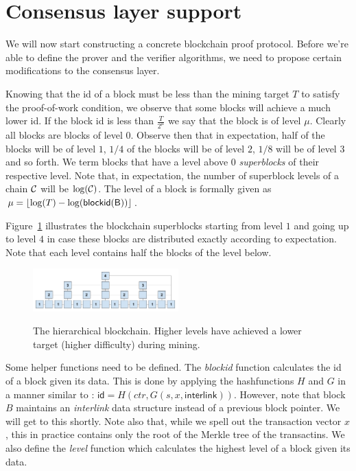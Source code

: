 \section{Consensus layer support}

We will now start constructing a concrete blockchain proof protocol. Before
we're able to define the prover and the verifier algorithms, we need to propose
certain modifications to the consensus layer.

Knowing that the id of a block must be less than the mining target $T$ to
satisfy the proof-of-work condition, we observe that some blocks will achieve a
much lower id. If the block id is less than $\frac{T}{2^\mu}$ we say that the
block is of level $\mu$. Clearly all blocks are blocks of level $0$. Observe
then that in expectation, half of the blocks will be of level $1$, $1/4$ of the
blocks will be of level $2$, $1/8$ will be of level $3$ and so forth. We term
blocks that have a level above 0 \textit{superblocks} of their respective
level. Note that, in expectation, the number of superblock levels of a chain
$\mathcal{C}$ will be $\log(\mathcal{C})$. The level of a block is formally given as $\mu
= \left \lfloor \log(T) - \log(\sf{blockid}(B)) \right \rfloor$.

Figure~\ref{fig.hierarchy} illustrates the blockchain superblocks starting from
level $1$ and going up to level $4$ in case these blocks are distributed
exactly according to expectation. Note that each level contains half the blocks
of the level below.

\begin{figure}
    \caption{The hierarchical blockchain.
    Higher levels have achieved a lower target (higher difficulty) during mining.}
    \centering
    \includegraphics[width=0.5\textwidth,keepaspectratio]{figures/hierarchical-ledger.png}
    \label{fig.hierarchy}
\end{figure}

Some helper functions need to be defined. The \textit{blockid} function
calculates the id of a block given its data. This is done by applying the
hashfunctions $H$ and $G$ in a manner similar to \cite{backbone}:
$\textsf{id} = H(ctr, G(s, x, \textsf{interlink}))$. However, note that block
$B$ maintains an \textit{interlink} data structure instead of a previous block
pointer. We will get to this shortly. Note also that, while we spell out the
transaction vector $x$, this in practice contains only the root of the Merkle
tree of the transactins. We also define the \textit{level} function which
calculates the highest level of a block given its data.

